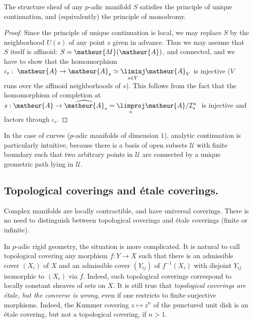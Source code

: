 \begin{pro}  
 The structure sheaf of any $p$-adic 
 manifold $S$ satisfies the principle of unique
 continuation, and (equivalently) the principle of monodromy.
\end{pro}
\begin{proof} 
 Since the principle of unique continuation is local, we may replace $S$
 by the neighborhood $U(s)$ of any 
 point $s$ given in advance. Thus we may assume that $S$ 
 itself is affinoid: $S=\matheur{M}(\matheur{A})$,
 and connected, and we have to show that the homomorphism 
 $\iota_s:\;\matheur{A}\rightarrow \matheur{A}_s\simeq
 \underset{s\in V}{\liminj}\matheur{A}_V$ is injective ($V$ runs over
 the affinoid neighborhoods of $s$).  This follows from the
 fact that the homomorphism of completion at 
 $s : \matheur{A}\rightarrow  \widehat{\matheur{A}}_s =
 \underset{n}{\limproj}\matheur{A}/\mathcal{I}_s^n\;$ is injective and factors
 through $\iota_s$.
\end{proof}  

In the case of curves (\ie $p$-adic manifolds of dimension $1$),
analytic continuation is particularly intuitive, because there is a basis
of open subsets $\mathcal{U}$ with finite boundary such that two arbitrary
points in $\mathcal{U}$ are connected by a unique geometric path lying in
$\mathcal{U}$.


\subsection{Topological coverings and \'etale coverings.}
\label{sub-top-cov-et-cov}
\begin{para}\label{para-complex-vs-padic}
 Complex manifolds are locally contractible,
 and have universal coverings.  There is no need to distinguish between
 topological
 coverings and \'etale coverings (finite or infinite).

 In $p$-adic rigid geometry, the situation is more complicated. It is
 natural to call
 topological covering any morphism $f: Y \rightarrow X$ such that there is
 an admissible
 cover $(X_i)$ of $X$ and an admissible cover $(Y_{ij})$ of $f^{-1}(X_i)$
 with disjoint $Y_{ij}$
 isomorphic to $(X_i)$ via  $f$. Indeed, such topological coverings
 correspond to locally constant
 sheaves of sets on $X$. It is still true that \emph{topological coverings
 are \'etale, but the converse is wrong}, even if one restricts to
 finite surjective morphisms. Indeed, the Kummer covering
 $z \mapsto z^n$ of the punctured unit disk is an \'etale 
 covering, but not a topological covering, if $n>1$.
\end{para}


